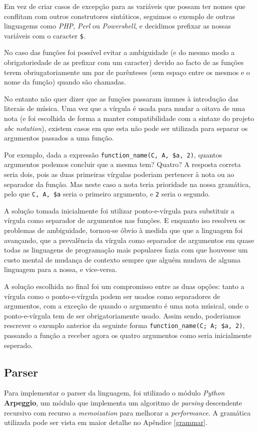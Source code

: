 Em vez de criar casos de excepção para as variáveis que possam ter nomes que conflitam com outros construtores sintáticos, seguimos o exemplo de outras linguagems como \textit{PHP}, \textit{Perl} ou \textit{Powershell}, e decidimos prefixar as nossas variáveis com o caracter \texttt{\$}.

No caso das funções foi possível evitar a ambiguidade (e do mesmo modo a obrigatoriedade de as prefixar com um caracter) devido ao facto de as funções terem obriugatoriamente um par de parênteses (sem espaço entre os mesmos e o nome da função) quando são chamadas.

No entanto não quer dizer que as funções passaram imunes à introdução das literais de música. Uma vez que a vírgula é usada para mudar a oitava de uma nota (e foi escolhida de forma a manter compatibilidade com a sintaxe do projeto \textit{abc notation}), existem casos em que esta não pode ser utilizada para separar os argumentos passados a uma função.

Por exemplo, dada a expressão \texttt{function\_name(C, A, \$a, 2)}, quantos argumentos podemos concluir que a mesma tem? Quatro? A resposta correta seria dois, pois as duas primeiras vírgulas poderiam pertencer à nota ou ao separador da função. Mas neste caso a nota teria prioridade na nossa gramática, pelo que \texttt{C, A, \$a} seria o primeiro argumento, e \texttt{2} seria o segundo.

A solução tomada inicialmente foi utilizar ponto-e-vírgula para substituir a vírgula como separador de argumentos nas funções. E enquanto iso resolveu os problemas de ambiguidade, tornou-se óbvio à medida que que a linguagem foi avançando, que a prevalência da vírgula como separador de argumentos em quase todas as linguagens de programação mais populares fazia com que houvesse um custo mental de mudança de contexto sempre que alguém mudava de alguma linguagem para a nossa, e vice-versa.

A solução escolhida no final foi um compromisso entre as duas opções: tanto a vírgula como o ponto-e-vírgula podem ser usados como separadores de argumentos, com a exceção de quando o argumento é uma nota músical, onde o ponto-e-vírgula tem de ser obrigatoriamente usado. Assim sendo, poderiamos rescrever o exemplo anterior da seguinte forma \texttt{function\_name(C; A; \$a, 2)}, passando a função a receber agora os quatro argumentos como seria inicialmente esperado.

\subsection{Parser}
Para implementar o parser da linguagem, foi utilizado o módulo \textit{Python} \textbf{Arpeggio}, um módulo que implementa um algoritmo de \textit{parsing} descendente recursivo com recurso a \textit{memoization} para melhorar a \textit{performance}. A gramática utilizada pode ser vista em maior detalhe no Apêndice \ref{grammar}.

